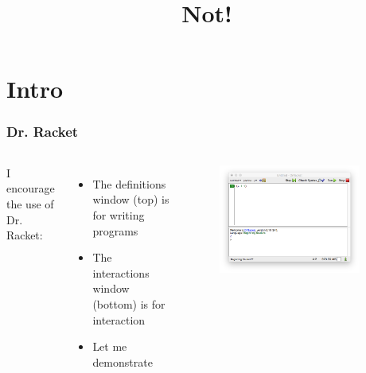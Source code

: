 \documentclass{beamer}
\title{Not!}
\begin{document}
\begin{frame}
\titlepage
\end{frame}

\section{Intro}

\begin{frame}
  \frametitle{Dr. Racket}
  \begin{columns}
    I encourage the use of Dr. Racket:
    \begin{itemize}
    \item<1-> The definitions window (top) is for writing programs
    \item<2-> The interactions window (bottom) is for interaction
    \item<3-> Let me demonstrate 
    \end{itemize}
    \begin{figure}
      \centering \includegraphics[width=0.9\textwidth]{images/drracket-plain.png}
    \end{figure}
  \end{columns}
\end{frame}
\end{document}
